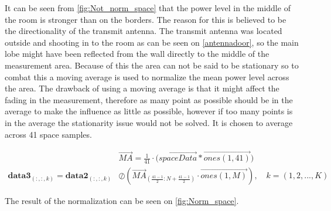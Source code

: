 It can be seen from \autoref{fig:Not_norm_space} that the power level in the middle of the room is stronger than on the borders. The reason for this is believed to be the directionality of the transmit antenna. The transmit antenna was located outside and shooting in to the room as can be seen on \autoref{antennadoor}, so the main lobe might have been reflected from the wall directly to the middle of the measurement area. Because of this the area can not be said to be stationary so to combat this a moving average is used to normalize the mean power level across the area. The drawback of using a moving average is that it might affect the fading in the measurement, therefore as many point as possible should be in the average to make the influence as little as possible, however if too many points is in the average the stationarity issue would not be solved. It is chosen to average across 41 space samples.

\begin{align}
&\overrightarrow{MA} = \frac{1}{41}\cdot \Big(\overrightarrow{spaceData}*\overrightarrow{ones(1,41)}\Big) \\
\textbf{data3}_{(:,:,k)} = \textbf{data2}_{(:,:,k)} &\oslash \left(\overrightarrow{MA}_{\left(\frac{41-1}{2}:N+\frac{41-1}{2}\right)}\cdot \overrightarrow{ones(1,M)}\right), \quad k = (1,2,...,K)
\end{align}
\begin{where}
\end{where}


The result of the normalization can be seen on \autoref{fig:Norm_space}.

